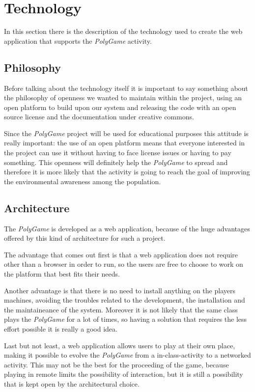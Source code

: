 \section{Technology}
In this section there is the description of the technology used to create the web application that supports the \emph{PolyGame} activity.

\subsection{Philosophy}
Before talking about the technology itself it is important to say something about the philosophy of openness we wanted to maintain within the project, using an open platform to build upon our system and releasing the code with an open source license and the documentation under creative commons.

Since the \emph{PolyGame} project will be used for educational purposes this attitude is really important: the use of an open platform means that everyone interested in the project can use it without having to face license issues or having to pay something. This openness will definitely help the \emph{PolyGame} to spread and therefore it is more likely that the activity is going to reach the goal of improving the environmental awareness among the population.

\subsection{Architecture}
The \emph{PolyGame} is developed as a web application, because of the huge advantages offered by this kind of architecture for such a project.

The advantage that comes out first is that a web application does not require other than a browser in order to run, so the users are free to choose to work on the platform that best fits their needs.

Another advantage is that there is no need to install anything on the players machines, avoiding the troubles related to the development, the installation and the maintaineance of the system.
Moreover it is not likely that the same class plays the \emph{PolyGame} for a lot of times, so having a solution that requires the less effort possible it is really a good idea.

Last but not least, a web application allows users to play at their own place, making it possible to evolve the \emph{PolyGame} from a in-class-activity to a networked activity. This may not be the best for the proceeding of the game, because playing in remote limits the possibility of interaction, but it is still a possibility that is kept open by the architectural choice.

